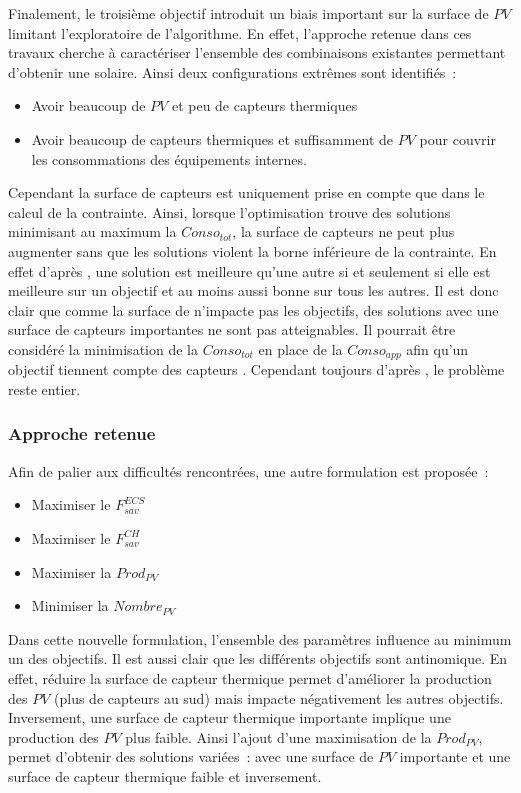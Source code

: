 Finalement, le troisième objectif introduit un biais important sur la surface de $PV$
limitant l’exploratoire de l’algorithme. En effet, l’approche retenue dans ces travaux
cherche à caractériser l’ensemble des combinaisons existantes permettant d’obtenir
une  solaire. Ainsi deux configurations extrêmes sont identifiés~:
\begin{itemize}
  \item Avoir beaucoup de $PV$ et peu de capteurs thermiques
  \item Avoir beaucoup de capteurs thermiques et suffisamment de $PV$ pour couvrir
        les consommations des équipements internes.
\end{itemize}
Cependant la surface de capteurs  est uniquement prise en compte que dans le
calcul de la contrainte. Ainsi, lorsque l’optimisation trouve des solutions minimisant au
maximum la $Conso_{tot}$, la surface de capteurs  ne peut plus augmenter sans que
les solutions violent la borne inférieure de la contrainte. En effet d’après
, une solution est meilleure qu’une autre si et seulement
si elle est meilleure sur un objectif et au moins aussi bonne sur tous les autres. Il est
donc clair que comme la surface de  n’impacte pas les objectifs, des solutions
avec une surface de capteurs  importantes ne sont pas atteignables. Il pourrait
être considéré la minimisation de la $Conso_{tot}$ en place de la $Conso_{app}$ afin qu’un
objectif tiennent compte des capteurs . Cependant toujours d’après
, le problème reste entier.


\subsubsection{Approche retenue} %
\label{ssub:approche_retenue}
\noindent Afin de palier aux difficultés rencontrées, une autre formulation est proposée~:
\begin{itemize}
  \item Maximiser le $F_{sav}^{ECS}$
  \item Maximiser le $F_{sav}^{CH}$
  \item Maximiser la $Prod_{PV}$
  \item Minimiser la $Nombre_{PV}$
\end{itemize}

Dans cette nouvelle formulation, l’ensemble des paramètres influence au minimum un des
objectifs. Il est aussi clair que les différents objectifs sont antinomique.
En effet, réduire la surface de capteur thermique permet d’améliorer la production des
$PV$ (plus de capteurs au sud) mais impacte négativement les autres objectifs.
Inversement, une surface de capteur thermique importante implique une production des $PV$
plus faible. Ainsi l’ajout d’une maximisation de la $Prod_{PV}$, permet d’obtenir des
solutions variées~: avec une surface de $PV$ importante et une surface de capteur
thermique faible et inversement.


